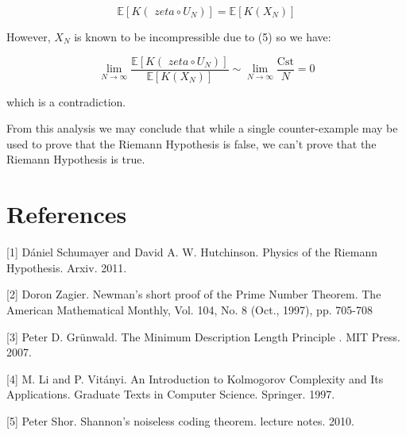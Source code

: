 \documentclass{article}
\begin{document}
\begin{equation}
\mathbb{E}[K(\textit{ zeta} \circ U_N)] = \mathbb{E}[K(X_N)]
\end{equation}

However, $X_N$ is known to be incompressible due to (5) so we have:

\begin{equation}
\lim_{N \to \infty} \frac{\mathbb{E}[K(\textit{ zeta} \circ U_N)]}{\mathbb{E}[K(X_N)]} \sim \lim_{N \to \infty} \frac{\text{Cst}}{N} = 0
\end{equation}

which is a contradiction.

From this analysis we may conclude that while a single counter-example may be used to prove that the Riemann Hypothesis is false, we can't prove that the Riemann Hypothesis is true. 

\section*{References}

\small

[1] Dániel Schumayer and David A. W. Hutchinson. Physics of the Riemann Hypothesis. Arxiv. 2011.

[2] Doron Zagier. Newman's short proof of the Prime Number Theorem. The American Mathematical Monthly, Vol. 104, No. 8 (Oct., 1997), pp. 705-708

[3] Peter D. Grünwald. The Minimum Description Length Principle
. MIT Press. 2007.

[4] M. Li and P. Vitányi. An Introduction to Kolmogorov Complexity and Its Applications. Graduate Texts in Computer Science. Springer. 1997.

[5] Peter Shor. Shannon’s noiseless coding theorem. lecture notes. 2010.
\end{document}
